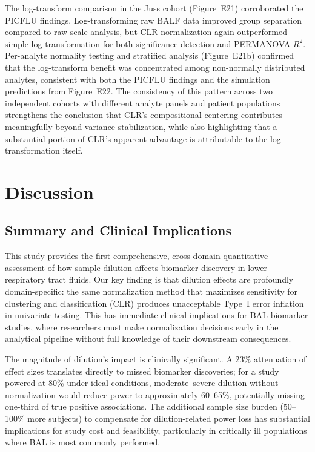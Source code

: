 \documentclass[12pt]{article}
\begin{document}
The log-transform comparison in the Juss cohort (Figure~E21) corroborated the PICFLU findings. Log-transforming raw BALF data improved group separation compared to raw-scale analysis, but CLR normalization again outperformed simple log-transformation for both significance detection and PERMANOVA $R^2$. Per-analyte normality testing and stratified analysis (Figure~E21b) confirmed that the log-transform benefit was concentrated among non-normally distributed analytes, consistent with both the PICFLU findings and the simulation predictions from Figure~E22. The consistency of this pattern across two independent cohorts with different analyte panels and patient populations strengthens the conclusion that CLR's compositional centering contributes meaningfully beyond variance stabilization, while also highlighting that a substantial portion of CLR's apparent advantage is attributable to the log transformation itself.

\section{Discussion}

\subsection{Summary and Clinical Implications}

This study provides the first comprehensive, cross-domain quantitative assessment of how sample dilution affects biomarker discovery in lower respiratory tract fluids. Our key finding is that dilution effects are profoundly domain-specific: the same normalization method that maximizes sensitivity for clustering and classification (CLR) produces unacceptable Type~I error inflation in univariate testing. This has immediate clinical implications for BAL biomarker studies, where researchers must make normalization decisions early in the analytical pipeline without full knowledge of their downstream consequences.

The magnitude of dilution's impact is clinically significant. A 23\% attenuation of effect sizes translates directly to missed biomarker discoveries; for a study powered at 80\% under ideal conditions, moderate--severe dilution without normalization would reduce power to approximately 60--65\%, potentially missing one-third of true positive associations. The additional sample size burden (50--100\% more subjects) to compensate for dilution-related power loss has substantial implications for study cost and feasibility, particularly in critically ill populations where BAL is most commonly performed.
\end{document}
